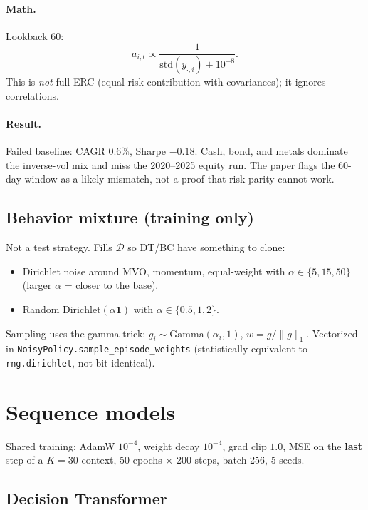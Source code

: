 \documentclass[11pt]{article}
\begin{document}
\paragraph{Math.}
Lookback 60:
\begin{equation}
a_{i,t}\propto \frac{1}{\mathrm{std}(y_{\cdot,i})+10^{-8}}.
\end{equation}
This is \emph{not} full ERC (equal risk contribution with covariances);
it ignores correlations.

\paragraph{Result.}
Failed baseline: CAGR $0.6\%$, Sharpe $-0.18$.
Cash, bond, and metals dominate the inverse-vol mix and miss the 2020--2025
equity run. The paper flags the 60-day window as a likely mismatch, not a proof
that risk parity cannot work.

\subsection{Behavior mixture (training only)}

Not a test strategy. Fills $\mathcal{D}$ so DT/BC have something to clone:
\begin{itemize}
\item Dirichlet noise around MVO, momentum, equal-weight with
      $\alpha\in\{5,15,50\}$ (larger $\alpha$ = closer to the base).
\item Random $\mathrm{Dirichlet}(\alpha\mathbf{1})$ with $\alpha\in\{0.5,1,2\}$.
\end{itemize}
Sampling uses the gamma trick:
$g_i\sim\mathrm{Gamma}(\alpha_i,1)$, $w=g/\|g\|_1$.
Vectorized in \texttt{NoisyPolicy.sample\_episode\_weights}
(statistically equivalent to \texttt{rng.dirichlet}, not bit-identical).

\section{Sequence models}
\label{sec:seq}

Shared training: AdamW $10^{-4}$, weight decay $10^{-4}$, grad clip $1.0$,
MSE on the \textbf{last} step of a $K=30$ context, 50 epochs $\times$ 200 steps,
batch 256, 5 seeds.

\subsection{Decision Transformer}
\end{document}
